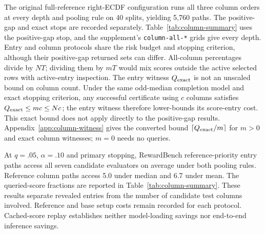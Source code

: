 The original full-reference right-ECDF configuration runs all three column orders at every depth and pooling rule on 40 splits, yielding 5,760 paths. The positive-gap and exact stops are recorded separately. Table~\ref{tab:column-summary} uses the positive-gap stop, and the supplement's \texttt{column-all-*} grids give every depth. Entry and column protocols share the risk budget and stopping criterion, although their positive-gap returned sets can differ. All-column percentages divide by $NT$; dividing them by $mT$ would mix scores outside the active selected rows with active-entry inspection. The entry witness $Q_{\rm exact}$ is not an unscaled bound on column count. Under the same odd-median completion model and exact stopping criterion, any successful certificate using $c$ columns satisfies $Q_{\rm exact}\le mc\le Nc$; the entry witness therefore lower-bounds its score-entry cost. This exact bound does not apply directly to the positive-gap results. Appendix~\ref{app:column-witness} gives the converted bound $\lceil Q_{\rm exact}/m\rceil$ for $m>0$ and exact column witnesses; $m=0$ needs no queries.

At $q=.05$, $\alpha=.10$ and primary stopping, RewardBench reference-priority entry paths access all seven candidate evaluators on average under both pooling rules. Reference column paths access 5.0 under median and 6.7 under mean. The queried-score fractions are reported in Table~\ref{tab:column-summary}. These results separate revealed entries from the number of candidate test columns involved. Reference and base setup costs remain recorded for each protocol. Cached-score replay establishes neither model-loading savings nor end-to-end inference savings.




